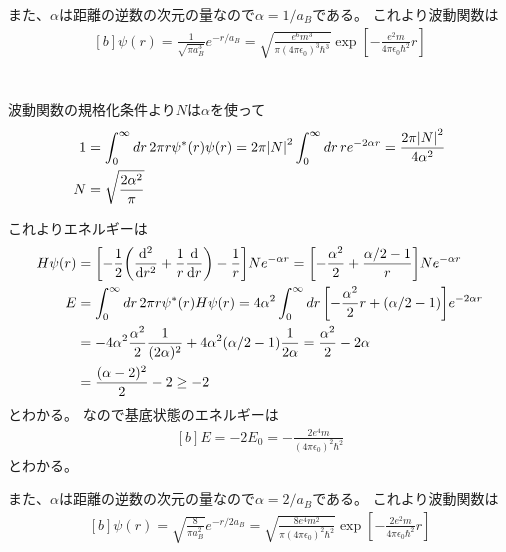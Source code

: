 \documentclass[../ap_2011.tex]{subfiles}
\begin{document}
また、\(\alpha\)は距離の逆数の次元の量なので\(\alpha=1/a_B\)である。
これより波動関数は
\begin{equation}\begin{aligned}[b]
    \psi(r)=\frac{1}{\sqrt{\pi a_B^3}}e^{-r/a_B}
    =\sqrt{\frac{e^6m^3}{\pi(4\pi\epsilon_0)^3\hbar^3}}\exp[-\frac{e^2m}{4\pi\epsilon_0\hbar^2}r]
\end{aligned}\end{equation}

\section{}
波動関数の規格化条件より\(N\)は\(\alpha\)を使って
\begin{equation}\begin{aligned}[b]
    1 &= \int_0^\infty dr\,2\pi r\psi^*(r)\psi(r)
    =2\pi\abs{N}^2\int_{0}^{\infty}dr\,re^{-2\alpha r}=\frac{2\pi\abs{N}^2}{4\alpha^2}\\
    N&=\sqrt{\frac{2\alpha^2}{\pi}}
\end{aligned}\end{equation}

これよりエネルギーは
\begin{equation}\begin{aligned}[b]
    H\psi(r) &=\qty[
    -\frac{1}{2}\qty(\dv[2]{r}+\frac{1}{r}\dv{r})-\frac{1}{r}]Ne^{-\alpha r}
    =\qty[-\frac{\alpha^2}{2}+\frac{\alpha/2-1}{r}]Ne^{-\alpha r}\\
    E &= \int_{0}^{\infty}dr\,2\pi r \psi^*(r)H\psi(r)
    = 4\alpha^2\int_{0}^{\infty}dr\,\qty[-\frac{\alpha^2}{2}r+(\alpha/2-1)]e^{-2\alpha r}\\
    &= -4\alpha^2\frac{\alpha^2}{2}\frac{1}{(2\alpha)^2}+4\alpha^2(\alpha/2-1)\frac{1}{2\alpha}
    = \frac{\alpha^2}{2}-2\alpha\\
    &=\frac{(\alpha-2)^2}{2}-2 \geq -2
\end{aligned}\end{equation}
とわかる。
なので基底状態のエネルギーは
\begin{equation}\begin{aligned}[b]
    E = -2E_0= -\frac{2e^4m}{(4\pi\epsilon_0)^2\hbar^2}
\end{aligned}\end{equation}
とわかる。

また、\(\alpha\)は距離の逆数の次元の量なので\(\alpha=2/a_B\)である。
これより波動関数は
\begin{equation}\begin{aligned}[b]
    \psi(r)=\sqrt{\frac{8}{\pi a_B^2}}e^{-r/2a_B}
    =\sqrt{\frac{8e^4m^2}{\pi(4\pi\epsilon_0)^2\hbar^2}}\exp[-\frac{2e^2m}{4\pi\epsilon_0\hbar^2}r]
\end{aligned}\end{equation}
\end{document}
